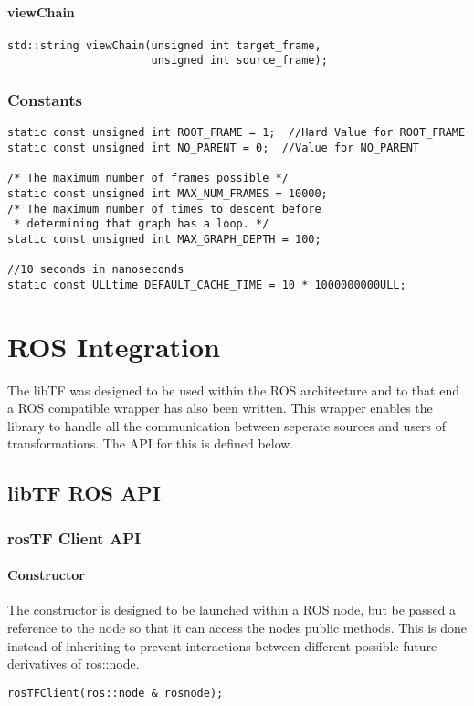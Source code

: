 \documentclass[12pt]{article}
\begin{document}
\paragraph{viewChain}
\begin{verbatim}
std::string viewChain(unsigned int target_frame, 
                      unsigned int source_frame);
\end{verbatim}

\subsubsection{Constants}
\begin{verbatim}
static const unsigned int ROOT_FRAME = 1;  //Hard Value for ROOT_FRAME
static const unsigned int NO_PARENT = 0;  //Value for NO_PARENT

/* The maximum number of frames possible */
static const unsigned int MAX_NUM_FRAMES = 10000;   
/* The maximum number of times to descent before 
 * determining that graph has a loop. */
static const unsigned int MAX_GRAPH_DEPTH = 100; 

//10 seconds in nanoseconds
static const ULLtime DEFAULT_CACHE_TIME = 10 * 1000000000ULL; 

\end{verbatim}

\section{ROS Integration}
The libTF was designed to be used within the ROS architecture and to that end 
a ROS compatible wrapper has also been written.  This wrapper enables the library
to handle all the communication between seperate sources and users of transformations.
The API for this is defined below.

\subsection{libTF ROS API}

\subsubsection {rosTF Client API}
\paragraph {Constructor}
The constructor is designed to be launched within a ROS node, but be passed a reference to 
the node so that it can access the nodes public methods.  This is done instead of inheriting
to prevent interactions between different possible future derivatives of ros::node. 
\begin{verbatim}
rosTFClient(ros::node & rosnode);
\end{verbatim}
\end{document}
